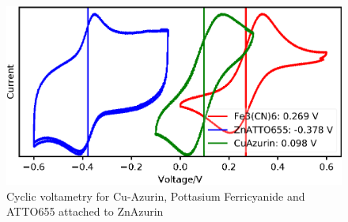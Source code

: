 \documentclass[11pt,a4paper,onecolumn]{article}
\begin{document}
\begin{figure}
  \centering
  \includegraphics{Figure_SI/cyclic_voltametry.eps}
  \makeatletter
  \renewcommand{\fnum@figure}{\figurename~S\thefigure}
  \makeatother
  \caption{Cyclic voltametry for Cu-Azurin, Pottasium Ferricyanide and ATTO655 attached to ZnAzurin}
  \label{SIfig: cyclic_voltametry}
\end{figure}


\end{document}
